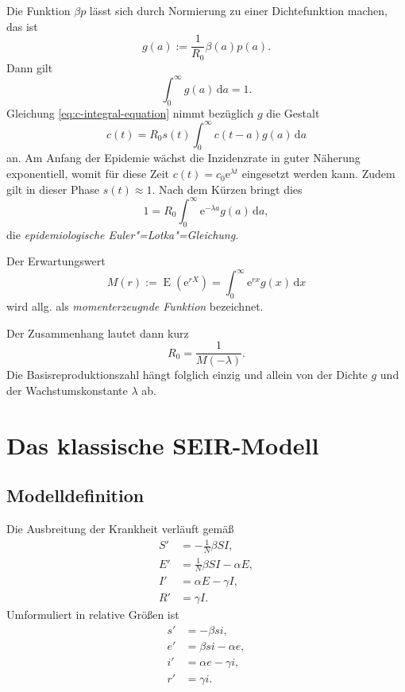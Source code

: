 \documentclass[a4paper,10pt,fleqn,twocolumn,twoside,dvipdfmx]{scrartcl}
\numberwithin{equation}{section}
\newcommand{\ee}{\mathrm e}
\begin{document}
Die Funktion $\beta p$ lässt sich durch Normierung zu einer
Dichtefunktion machen, das ist%
\begin{equation}
g(a) := \frac{1}{R_0} \beta(a)p(a).
\end{equation}
Dann gilt
\begin{equation}
\int_0^\infty g(a)\,\mathrm da = 1.
\end{equation}
Gleichung \eqref{eq:c-integral-equation} nimmt bezüglich
$g$ die Gestalt%
\begin{equation}
c(t) = R_0s(t)\int_0^\infty c(t-a)g(a)\,\mathrm da
\end{equation}
an. Am Anfang der Epidemie wächst die Inzidenzrate in guter Näherung
exponentiell, womit für diese Zeit $c(t)=c_0\ee^{\lambda t}$
eingesetzt werden kann. Zudem gilt in dieser Phase $s(t)\approx 1$.
Nach dem Kürzen bringt dies%
\begin{equation}
1 = R_0\int_0^\infty \ee^{-\lambda a}g(a)\,\mathrm da,
\end{equation}
die \emph{epidemiologische Euler"=Lotka"=Gleichung}.

Der Erwartungswert
\begin{equation}
M(r) := \operatorname{E}(\ee^{rX})
= \int_0^\infty \ee^{rx}g(x)\,\mathrm dx
\end{equation}
wird allg. als \emph{momenterzeugnde Funktion} bezeichnet.

Der Zusammenhang lautet dann kurz
\begin{equation}
R_0 = \frac{1}{M(-\lambda)}.
\end{equation}
Die Basisreproduktionszahl hängt folglich einzig und allein von
der Dichte $g$ und der Wachstumskonstante $\lambda$ ab.


\section{Das klassische SEIR-Modell}

\subsection{Modelldefinition}
Die Ausbreitung der Krankheit verläuft gemäß%
\begin{align}
S' &= -\tfrac{1}{N} \beta SI,\\
E' &= \tfrac{1}{N} \beta SI - \alpha E,\\
I' &= \alpha E - \gamma I,\\
R' &= \gamma I.
\end{align}
Umformuliert in relative Größen ist
\begin{align}
\label{eq:seir-s} s' &= - \beta si,\\
\label{eq:seir-e} e' &= \beta si - \alpha e,\\
\label{eq:seir-i} i' &= \alpha e - \gamma i,\\
\label{eq:seir-r} r' &= \gamma i.
\end{align}
\end{document}
